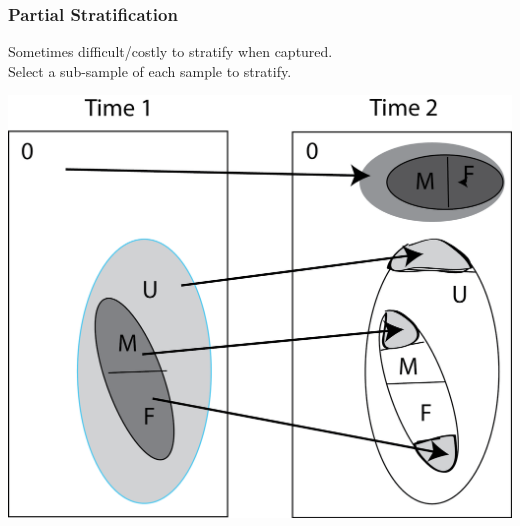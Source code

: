 \documentclass{beamer}
\begin{document}
\begin{frame}\frametitle{Partial Stratification} %
Sometimes difficult/costly to stratify when captured.\\
Select a sub-sample of each sample to stratify.

\includegraphics[height=0.8 \textheight]{PartialStrat.png}

\end{frame}


\end{document}
